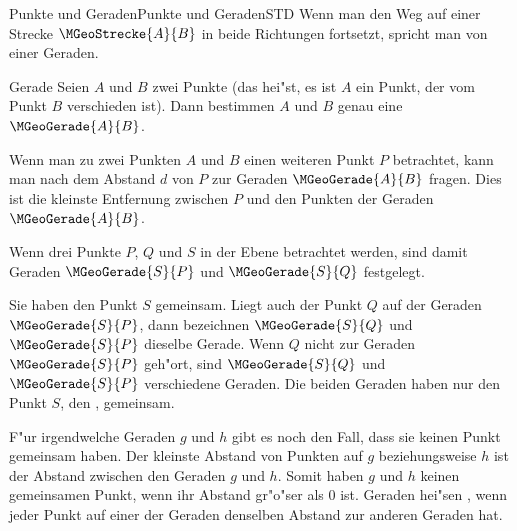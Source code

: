 \begin{MXContent}{Punkte und Geraden}{Punkte und Geraden}{STD}
Wenn man den Weg auf einer Strecke $\MGeoStrecke{A}{B}$ in beide Richtungen 
fortsetzt, spricht man von einer Geraden.

\begin{MXInfo}{Gerade}
Seien $A$ und $B$ zwei Punkte (das hei"st, es ist $A$ ein Punkt, der vom 
Punkt $B$ verschieden ist). Dann bestimmen $A$ und $B$ genau eine 
 $\MGeoGerade{A}{B}$.
\end{MXInfo}
Wenn man zu zwei Punkten $A$ und $B$ einen weiteren Punkt $P$ betrachtet,
kann man nach dem Abstand $d$ von $P$ zur Geraden $\MGeoGerade{A}{B}$ fragen.
Dies ist die kleinste Entfernung zwischen $P$ und den Punkten der Geraden
$\MGeoGerade{A}{B}$.

\begin{center}
\end{center}

Wenn drei Punkte $P$, $Q$ und $S$ in der Ebene betrachtet werden, sind damit
Geraden $\MGeoGerade{S}{P}$ und $\MGeoGerade{S}{Q}$ festgelegt.

Sie haben den Punkt $S$ gemeinsam. Liegt auch der Punkt $Q$ auf der Geraden 
$\MGeoGerade{S}{P}$, dann bezeichnen $\MGeoGerade{S}{Q}$ und $\MGeoGerade{S}{P}$
dieselbe Gerade. 
Wenn $Q$ nicht zur Geraden $\MGeoGerade{S}{P}$ geh"ort, sind $\MGeoGerade{S}{Q}$
und $\MGeoGerade{S}{P}$ verschiedene Geraden. Die beiden Geraden haben nur 
den Punkt $S$, den , gemeinsam.

F"ur irgendwelche Geraden $g$ und $h$ gibt es noch den Fall, dass sie keinen 
Punkt gemeinsam haben. Der kleinste Abstand von Punkten auf $g$ beziehungsweise
$h$ ist der Abstand zwischen den Geraden $g$ und $h$. Somit haben $g$ und $h$
keinen gemeinsamen Punkt, wenn ihr Abstand gr"o"ser als $0$ ist.
Geraden hei"sen , wenn jeder Punkt auf einer der 
Geraden denselben Abstand zur anderen Geraden hat.


\end{MXContent}

